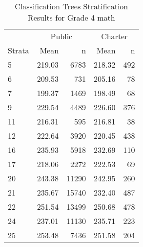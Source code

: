 \begin{table}[ht]
\centering
\caption{Classification Trees Stratification Results for Grade 4 math} 
\label{g4math-circpsa-tree}
\begin{tabular}{lrr@{\extracolsep{.2cm}}rr}
  \hline
   & \multicolumn{2}{c}{Public} & \multicolumn{2}{c}{Charter} \\ \cline{2-3} \cline{4-5} Strata & Mean & n & Mean & n \\ \hline
5 & 219.03 & 6783 & 218.32 & 492 \\ 
  6 & 209.53 & 731 & 205.16 &  78 \\ 
  7 & 199.37 & 1469 & 198.49 &  68 \\ 
  9 & 229.54 & 4489 & 226.60 & 376 \\ 
  11 & 216.31 & 595 & 216.81 &  38 \\ 
  12 & 222.64 & 3920 & 220.45 & 438 \\ 
  16 & 235.93 & 5918 & 232.69 & 110 \\ 
  17 & 218.06 & 2272 & 222.53 &  69 \\ 
  20 & 243.38 & 11290 & 242.95 & 260 \\ 
  21 & 235.67 & 15740 & 232.40 & 487 \\ 
  22 & 251.54 & 13499 & 250.68 & 478 \\ 
  24 & 237.01 & 11130 & 235.71 & 223 \\ 
  25 & 253.48 & 7436 & 251.58 & 204 \\ 
   \hline
\end{tabular}
\end{table}
